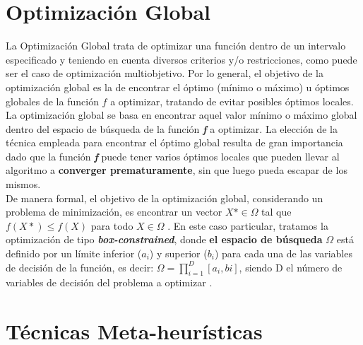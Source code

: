 

\section{Optimización Global}
\label{sec:OPT}


La Optimización Global trata de optimizar una función dentro de un intervalo especificado y teniendo en cuenta diversos criterios y/o restricciones, como puede ser el caso de optimización multiobjetivo. Por lo general, el objetivo de la optimización global es la de encontrar el óptimo (mínimo o máximo) u óptimos globales de la función $f$ a optimizar, tratando de evitar posibles óptimos locales. 
La optimización global se basa en encontrar aquel valor mínimo o máximo global dentro del espacio de búsqueda de la función \textbf{\textit{f}} a optimizar. La elección de la técnica empleada para encontrar el óptimo global resulta de gran importancia dado que la función \textbf{\textit{f}} puede tener varios óptimos locales que pueden llevar al algoritmo a \textbf{converger prematuramente}, sin que luego pueda escapar de los mismos. \\
De manera formal, el objetivo de la optimización global, considerando un problema de minimización, es encontrar un vector $X* \in \Omega$ tal que $f(X*) \leq f(X)$ para todo $X \in \Omega$ \cite{Segredo2017}.
En este caso particular, tratamos la optimización de tipo \textbf{\textit{box-constrained}}, donde \textbf{el espacio de búsqueda} $\Omega$ está definido por un límite inferior ($a_{i}$) y superior ($b_{i}$) para cada una de las variables de decisión de la función, es decir: $\Omega = \prod^{D}_{i=1}[a_{i}, b{i}]$, siendo D el número de variables de decisión del problema a optimizar \cite{Segredo2017}.


\section{Técnicas Meta-heurísticas}
\label{sec:META}

